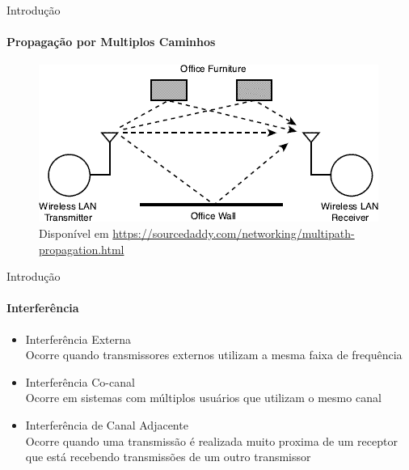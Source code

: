 \documentclass[c]{beamer}
\begin{document}
\begin{darkframes}
  \begin{frame}{Introdução}
    \framesubtitle{Propagação por Multiplos Caminhos}
    \begin{figure}[ht]
      \centering
      \includegraphics[width=\textwidth]{resources/multipath.png}\\
      \footnotesize{Disponível em  \url{https://sourcedaddy.com/networking/multipath-propagation.html}}
    \end{figure}
  \end{frame}

  \begin{frame}{Introdução}
    \framesubtitle{Interferência}
    \begin{itemize}
      \item \alert{Interferência Externa}             \\ Ocorre quando transmissores externos utilizam a mesma faixa de frequência
      \item \alert{Interferência Co-canal}            \\ Ocorre em sistemas com múltiplos usuários que utilizam o mesmo canal
      \item \alert{Interferência de Canal Adjacente}  \\ Ocorre quando uma transmissão é realizada muito proxima de um receptor que está recebendo transmissões de um outro transmissor
    \end{itemize}
  \end{frame}


\end{darkframes}
\end{document}
